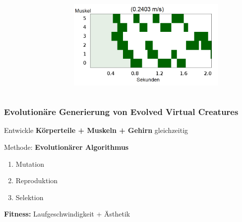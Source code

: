 \documentclass{beamer}
\begin{document}
\begin{frame}
\begin{columns}
\begin{figure}
		\end{figure}
		\begin{figure}
			\includegraphics[width=0.9\textwidth]{img/hum36.png}
		\end{figure}
	\end{columns}
\end{frame}


\begin{frame}
	\frametitle{Evolutionäre Generierung von Evolved Virtual Creatures}
	Entwickle \textbf{Körperteile + Muskeln + Gehirn} gleichzeitig\\ \pause
	\vspace{2em}
	
	Methode: \textbf{Evolutionärer Algorithmus} \pause
	\begin{enumerate}
		\item Mutation
		\item Reproduktion
		\item Selektion
	\end{enumerate}
	\pause
	\vspace{2em}
	\textbf{Fitness:} Laufgeschwindigkeit \pause  + Ästhetik
\end{frame}
\end{document}
